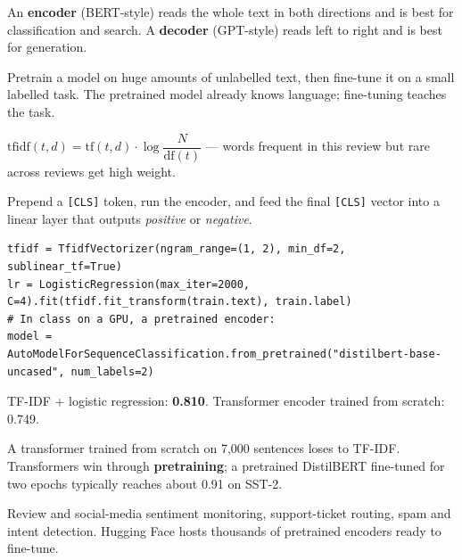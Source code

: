 \documentclass[11pt,a4paper]{article}
\begin{document}

\begin{bdef}
An \textbf{encoder} (BERT-style) reads the whole text in both directions and is best for classification and search. A \textbf{decoder} (GPT-style) reads left to right and is best for generation.
\end{bdef}
\begin{bdef}
Pretrain a model on huge amounts of unlabelled text, then fine-tune it on a small labelled task. The pretrained model already knows language; fine-tuning teaches the task.
\end{bdef}
\begin{bmath}
$\mathrm{tfidf}(t,d)=\mathrm{tf}(t,d)\cdot\log\dfrac{N}{\mathrm{df}(t)}$ --- words frequent in this review but rare across reviews get high weight.
\end{bmath}
\begin{bex}
Prepend a \texttt{[CLS]} token, run the encoder, and feed the final \texttt{[CLS]} vector into a linear layer that outputs \emph{positive} or \emph{negative}.
\end{bex}
\begin{bcode}
\begin{lstlisting}
tfidf = TfidfVectorizer(ngram_range=(1, 2), min_df=2, sublinear_tf=True)
lr = LogisticRegression(max_iter=2000, C=4).fit(tfidf.fit_transform(train.text), train.label)
# In class on a GPU, a pretrained encoder:
model = AutoModelForSequenceClassification.from_pretrained("distilbert-base-uncased", num_labels=2)
\end{lstlisting}
\end{bcode}
\begin{bres}
TF-IDF + logistic regression: \textbf{0.810}. \qquad Transformer encoder trained from scratch: 0.749.
\end{bres}
\begin{bwarn}
A transformer trained from scratch on 7,000 sentences loses to TF-IDF. Transformers win through \textbf{pretraining}; a pretrained DistilBERT fine-tuned for two epochs typically reaches about 0.91 on SST-2.
\end{bwarn}
\begin{bapp}
Review and social-media sentiment monitoring, support-ticket routing, spam and intent detection. Hugging Face hosts thousands of pretrained encoders ready to fine-tune.
\end{bapp}
\end{document}
